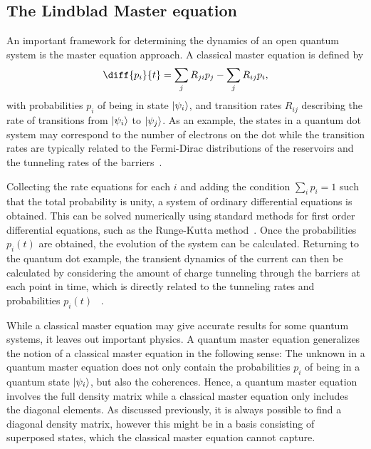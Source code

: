 \documentclass[../main.tex]{subfiles}
\begin{document}
\subsection{The Lindblad Master equation}\label{sec:lind}
An important framework for determining the dynamics of an open quantum system is the master equation approach. A classical master equation is defined by
\begin{equation}\label{master}
    \diff{p_i}{t} = \sum_j R_{ji}p_j  - \sum_j R_{ij}p_i,
\end{equation}
with probabilities $p_i$ of being in state $\ket{\psi_i}$, and transition rates $R_{ij}$ describing the rate of transitions from $\ket{\psi_i}$ to $\ket{\psi_j}$. As an example, the states in a quantum dot system may correspond to the number of electrons on the dot while the transition rates are typically related to the Fermi-Dirac distributions of the reservoirs and the tunneling rates of the barriers~\cite{transport}.

Collecting the rate equations for each $i$ and adding the condition $\sum_i p_i = 1$ such that the total probability is unity, a system of ordinary differential equations is obtained. This can be solved numerically using standard methods for first order differential equations, such as the Runge-Kutta method~\cite{iserles}. Once the probabilities $p_i(t)$ are obtained, the evolution of the system can be calculated. Returning to the quantum dot example, the transient dynamics of the current can then be calculated by considering the amount of charge tunneling through the barriers at each point in time, which is directly related to the tunneling rates and probabilities $p_i(t)$ ~\cite{transport}.

While a classical master equation may give accurate results for some quantum systems, it leaves out important physics. A quantum master equation generalizes the notion of a classical master equation in the following sense: The unknown in a quantum master equation does not only contain the probabilities $p_i$ of being in a quantum state $\ket{\psi_i}$, but also the coherences. Hence, a quantum master equation involves the full density matrix while a classical master equation only includes the diagonal elements. As discussed previously, it is always possible to find a diagonal density matrix, however this might be in a basis consisting of superposed states, which the classical master equation cannot capture.
\end{document}

